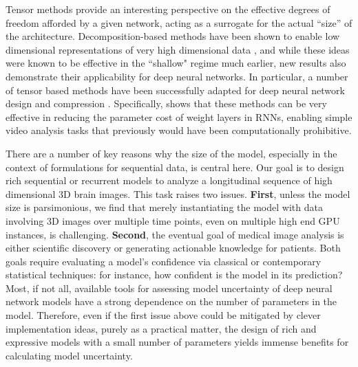 Tensor methods provide
an interesting perspective on the effective degrees of freedom afforded 
by a given network, acting as a surrogate for the actual ``size'' of the architecture.
Decomposition-based methods have been shown to enable low dimensional representations of very high dimensional data \citep{hwangCvpr18,novikov2016exponential}, 
and while these ideas were known to be effective in the ``shallow" regime much earlier, new results also demonstrate their applicability for deep neural 
networks. 
In particular, a number of tensor based methods have been successfully adapted for deep neural network design and compression \citep{cohen2016expressive,zhang2017tucker,yu2017compressing,xiong2019antnets}.
Specifically, \cite{pmlr-v70-yang17e} shows that these methods can be very effective in reducing the parameter cost of weight layers in RNNs, enabling simple video analysis tasks that previously would have been computationally prohibitive.

There are a number of key reasons why the size of the model, especially in the context of formulations for sequential data, is central here. Our goal is to design rich sequential or recurrent models to analyze a longitudinal sequence of high dimensional 3D brain images. 
This task raises two issues. \textbf{First}, 
unless the model size is parsimonious, we find that merely instantiating the 
model with data involving 3D images over multiple time points, even on multiple high end GPU instances, is challenging.
\textbf{Second}, 
the eventual goal of medical image analysis is either scientific discovery or generating 
actionable knowledge for patients. 
Both goals require evaluating a model's confidence via 
classical or contemporary statistical techniques: for instance, how confident is the model in its prediction?  
Most, if not all, available tools for assessing 
model uncertainty of deep neural network models 
have a strong dependence on the number of parameters in 
the model. Therefore, even if the first issue above could be mitigated by clever implementation ideas, purely as a practical 
matter, the design of rich and expressive models with a small number of parameters yields immense benefits for calculating model uncertainty.

